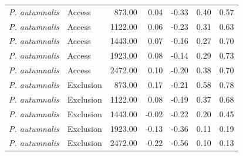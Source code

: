 \begin{tabular}{llrrrrr}
  \textit{P. autumnalis} & Access & 873.00 & 0.04 & -0.33 & 0.40 & 0.57 \\ 
  \textit{P. autumnalis} & Access & 1122.00 & 0.06 & -0.23 & 0.31 & 0.63 \\ 
  \textit{P. autumnalis} & Access & 1443.00 & 0.07 & -0.16 & 0.27 & 0.70 \\ 
  \textit{P. autumnalis} & Access & 1923.00 & 0.08 & -0.14 & 0.29 & 0.73 \\ 
  \textit{P. autumnalis} & Access & 2472.00 & 0.10 & -0.20 & 0.38 & 0.70 \\ 
  \textit{P. autumnalis} & Exclusion & 873.00 & 0.17 & -0.21 & 0.58 & 0.78 \\ 
  \textit{P. autumnalis} & Exclusion & 1122.00 & 0.08 & -0.19 & 0.37 & 0.68 \\ 
  \textit{P. autumnalis} & Exclusion & 1443.00 & -0.02 & -0.22 & 0.20 & 0.45 \\ 
  \textit{P. autumnalis} & Exclusion & 1923.00 & -0.13 & -0.36 & 0.11 & 0.19 \\ 
  \textit{P. autumnalis} & Exclusion & 2472.00 & -0.22 & -0.56 & 0.10 & 0.13 \\ 
   \hline
\end{tabular}